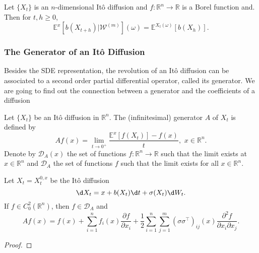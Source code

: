 \begin{theorem}
    Let $\{X_t\}$ is an $n$-dimensional Itô diffusion and $f:\mathbb{R}^n\to\mathbb{R}$ is a Borel function and. Then for $t,h\ge0$,
    \begin{equation}
        \mathbb{E}^x\left[b(X_{t+h})|\mathcal{W}^{(m)}\right](\omega)=\mathbb{E}^{X_t(\omega)}[b(X_h)].
    \end{equation}
\end{theorem}

\subsubsection{The Generator of an Itô Diffusion}
Besides the SDE representation, the revolution of an Itô diffusion can be associated to a second order
partial differential operator, called its generator. We are going to find out the connection between a generator and the coefficients of a diffusion

\begin{definition}
    Let $\{X_t\}$ be an Itô diffusion in $\mathbb{R}^n$. The (infinitesimal) generator $A$ of $X_t$ is defined by
    \begin{equation}
        \label{definition:gen}
        Af(x)=\lim\limits_{t\to0^+}\dfrac{\mathbb{E}^x[f(X_t)]-f(x)}{t},\,\,x\in\mathbb{R}^n.
    \end{equation}
    Denote by $\mathcal{D}_A(x)$ the set of functions $f:\mathbb{R}^n\to\mathbb{R}$ such that the limit exists at $x\in\mathbb{R}^n$ and $\mathcal{D}_A$ the set of functions $f$ such that the limit exists for all $x\in\mathbb{R}^n$.
\end{definition}


\begin{theorem}
    Let $X_t=X^{0,x}_t$ be the Itô diffusion
    $$\d X_t = x+b(X_t)\d t+\sigma(X_t)\d W_t.$$
    If $f\in C^2_0(\mathbb{R}^n)$, then $f\in\mathcal{D}_A$ and
    \begin{equation}
        \label{equation:gen}
        Af(x)=f(x)+\sum\limits_{i=1}^n f_i(x)\dfrac{\partial f}{\partial x_i} + \dfrac{1}{2}\sum\limits_{i=1}^n\sum\limits_{j=1}^m(\sigma \sigma^\top)_{ij}(x)\dfrac{\partial^2f}{\partial x_i\partial x_j}.
    \end{equation}
\end{theorem}

\begin{proof}

\end{proof}

